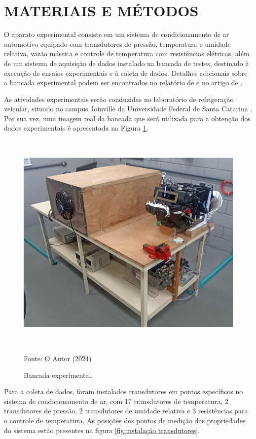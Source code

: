 \section[\MakeUppercase{Materiais e Métodos}]{\texorpdfstring{\MakeUppercase{Materiais e Métodos}}{MATERIAIS E MÉTODOS}}\label{sec:materiais e métodos}

O aparato experimental consiste em um sistema de condicionamento de ar automotivo equipado com transdutores de pressão, temperatura e umidade relativa, vazão mássica e controle de temperatura com resistências elétricas, além de um sistema de aquisição de dados instalado na bancada de testes, destinado à execução de ensaios experimentais e à coleta de dados. Detalhes adicionais sobre a bancada experimental podem ser encontrados no relatório de \textcite{deoliveira2023} e no artigo de \textcite{dasilva2024}.

As atividades experimentais serão conduzidas no laboratório de refrigeração veicular, situado no campus Joinville da Universidade Federal de Santa Catarina \cite{reve2023}. Por sua vez, uma imagem real da bancada que será utilizada para a obtenção dos dados experimentais é apresentada na Figura \ref{fig:bancada de teste}.

\begin{figure}[ht]
    \centering
     \caption{Bancada experimental.}
    \includegraphics[width=13.56cm, height=10.99cm]{FigurasdoTexto/Bancada Experimental.png}
    \vspace{5pt}  %
    
    {\footnotesize Fonte: O Autor (2024)}  %
    \label{fig:bancada de teste}
\end{figure}
\newpage
Para a coleta de dados, foram instalados transdutores em pontos específicos no sistema de condicionamento de ar, com 17 transdutores de temperatura, 2 transdutores de pressão, 2 transdutores de umidade relativa e 3 resistências para o controle de temperatura. As posições dos pontos de medição das propriedades do sistema estão presentes na figura \ref{fig:instalação transdutores}. 

